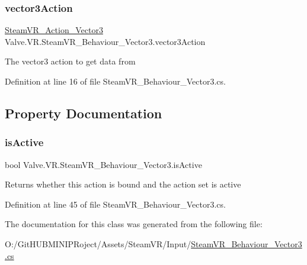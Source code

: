 \subsubsection{\texorpdfstring{vector3Action}{vector3Action}}
{\footnotesize\ttfamily \mbox{\hyperlink{class_valve_1_1_v_r_1_1_steam_v_r___action___vector3}{Steam\+V\+R\+\_\+\+Action\+\_\+\+Vector3}} Valve.\+V\+R.\+Steam\+V\+R\+\_\+\+Behaviour\+\_\+\+Vector3.\+vector3\+Action}



The vector3 action to get data from 



Definition at line 16 of file Steam\+V\+R\+\_\+\+Behaviour\+\_\+\+Vector3.\+cs.



\subsection{Property Documentation}
\mbox{\label{class_valve_1_1_v_r_1_1_steam_v_r___behaviour___vector3_af271a55bc70741d4fe6cc85b379c335c}} 
\subsubsection{\texorpdfstring{isActive}{isActive}}
{\footnotesize\ttfamily bool Valve.\+V\+R.\+Steam\+V\+R\+\_\+\+Behaviour\+\_\+\+Vector3.\+is\+Active\hspace{0.3cm}{\ttfamily [get]}}



Returns whether this action is bound and the action set is active 



Definition at line 45 of file Steam\+V\+R\+\_\+\+Behaviour\+\_\+\+Vector3.\+cs.



The documentation for this class was generated from the following file\+:\begin{DoxyCompactItemize}
\item 
O\+:/\+Git\+H\+U\+B\+M\+I\+N\+I\+P\+Roject/\+Assets/\+Steam\+V\+R/\+Input/\mbox{\hyperlink{_steam_v_r___behaviour___vector3_8cs}{Steam\+V\+R\+\_\+\+Behaviour\+\_\+\+Vector3.\+cs}}\end{DoxyCompactItemize}
